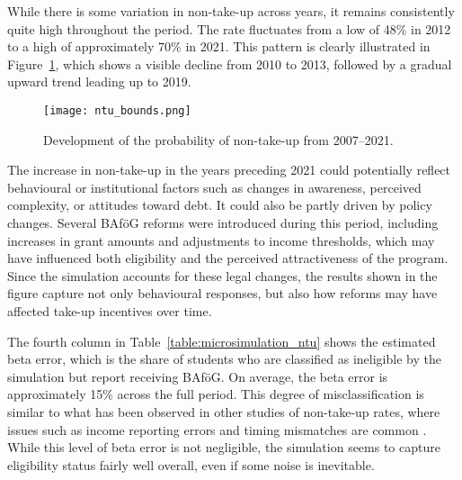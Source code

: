 


While there is some variation in non-take-up across years, it remains consistently quite high throughout the period. 
The rate fluctuates from a low of 48\% in 2012 to a high of approximately 70\% in 2021. 
This pattern is clearly illustrated in Figure~\ref{fig:ntu_bounds_over_years}, which shows a visible decline from 2010 to 2013, followed by a gradual upward trend leading up to 2019. 

\begin{figure}[htbp]
  \centering
  \texttt{[image: ntu\_bounds.png]}
  \caption{Development of the probability of non-take-up from 2007--2021.}
  \label{fig:ntu_bounds_over_years}
\end{figure}

The increase in non-take-up in the years preceding 2021 could potentially reflect behavioural or institutional factors such as changes in awareness, perceived complexity, or attitudes toward debt. 
It could also be partly driven by policy changes. 
Several BAföG reforms were introduced during this period, including increases in grant amounts and adjustments to income thresholds, which may have influenced both eligibility and the perceived attractiveness of the program. 
Since the simulation accounts for these legal changes, the results shown in the figure capture not only behavioural responses, but also how reforms may have affected take-up incentives over time.


The fourth column in Table~\ref{table:microsimulation_ntu} shows the estimated beta error, which is the share of students who are classified as ineligible by the simulation but report receiving BAföG. 
On average, the beta error is approximately 15\% across the full period. 
This degree of misclassification is similar to what has been observed in other studies of non-take-up rates, where issues such as income reporting errors and timing mismatches are common \citep{frick_claim_2007}.
While this level of beta error is not negligible, the simulation seems to capture eligibility status fairly well overall, even if some noise is inevitable.

